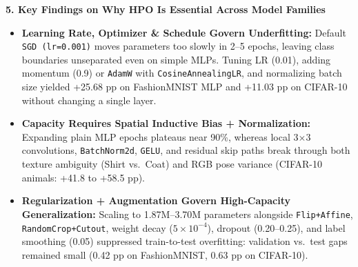 \documentclass[10pt,a4paper]{article}
\begin{document}
\vspace{4pt}
\textbf{\textcolor{accent}{5. Key Findings on Why HPO Is Essential Across Model Families}}
\vspace{1pt}
\begin{itemize}\setlength{\itemsep}{2pt}\setlength{\parskip}{0pt}\setlength{\topsep}{2pt}\setlength{\leftmargin}{14pt}
\item \textbf{Learning Rate, Optimizer \& Schedule Govern Underfitting:} Default \texttt{SGD (lr=0.001)} moves parameters too slowly in 2--5 epochs, leaving class boundaries unseparated even on simple MLPs. Tuning LR (0.01), adding momentum (0.9) or \texttt{AdamW} with \texttt{CosineAnnealingLR}, and normalizing batch size yielded +25.68 pp on FashionMNIST MLP and +11.03 pp on CIFAR-10 without changing a single layer.
\item \textbf{Capacity Requires Spatial Inductive Bias + Normalization:} Expanding plain MLP epochs plateaus near 90\%, whereas local 3$\times$3 convolutions, \texttt{BatchNorm2d}, \texttt{GELU}, and residual skip paths break through both texture ambiguity (Shirt vs.\ Coat) and RGB pose variance (CIFAR-10 animals: +41.8 to +58.5 pp).
\item \textbf{Regularization + Augmentation Govern High-Capacity Generalization:} Scaling to 1.87M--3.70M parameters alongside \texttt{Flip+Affine}, \texttt{RandomCrop+Cutout}, weight decay ($5\times 10^{-4}$), dropout (0.20--0.25), and label smoothing (0.05) suppressed train-to-test overfitting: validation vs.\ test gaps remained small (0.42 pp on FashionMNIST, 0.63 pp on CIFAR-10).
\end{itemize}
\end{document}
